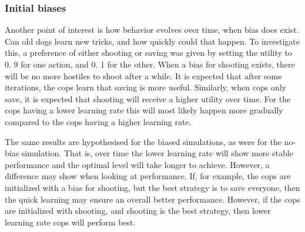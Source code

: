 \subsubsection{Initial biases}
Another point of interest is how behavior evolves over time, when bias does exist.
Can old dogs learn new tricks, and how quickly could that happen.
To investigate this, a preference of either shooting or saving was given by setting the utility to 0.
9 for one action, and 0.
1 for the other.
When a bias for shooting exists, there will be no more hostiles to shoot after a while.
It is expected that after some iterations, the cops learn that saving is more useful.
Similarly, when cops only save, it is expected that shooting will receive a higher utility over time.
For the cops having a lower learning rate this will most likely happen more gradually compared to the cops having a higher learning rate.


The same results are hypothesised for the biased simulations, as were for the no-bias simulation.
That is, over time the lower learning rate will show more stable performance and the optimal level will take longer to achieve.
However, a difference may show when looking at performance.
If, for example, the cops are initialized with a bias for shooting, but the best strategy is to save everyone, then the quick learning may ensure an overall better performance.
However, if the cops are initialized with shooting, and shooting is the best strategy, then lower learning rate cops will perform best.

